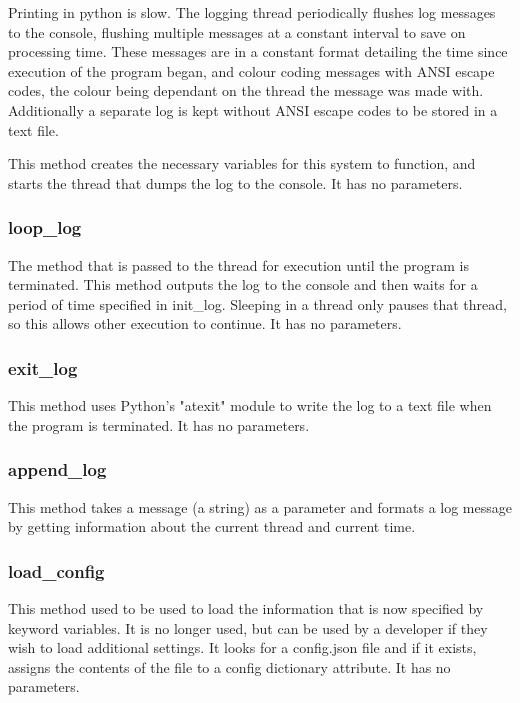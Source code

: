 \documentclass{report}
\begin{document}
Printing in python is slow. The logging thread periodically flushes log messages to the console, flushing multiple messages at a constant interval to save on processing time. These messages are in a constant format detailing the time since execution of the program began, and colour coding messages with ANSI escape codes, the colour being dependant on the thread the message was made with. Additionally a separate log is kept without ANSI escape codes to be stored in a text file.

This method creates the necessary variables for this system to function, and starts the thread that dumps the log to the console. It has no parameters.

\subsubsection{loop\_log}

The method that is passed to the thread for execution until the program is terminated. This method outputs the log to the console and then waits for a period of time specified in init\_log. Sleeping in a thread only pauses that thread, so this allows other execution to continue. It has no parameters.

\subsubsection{exit\_log}

This method uses Python's "atexit" module to write the log to a text file when the program is terminated. It has no parameters.

\subsubsection{append\_log}

This method takes a message (a string) as a parameter and formats a log message by getting information about the current thread and current time.

\subsubsection{load\_config}

This method used to be used to load the information that is now specified by keyword variables. It is no longer used, but can be used by a developer if they wish to load additional settings. It looks for a config.json file and if it exists, assigns the contents of the file to a config dictionary attribute. It has no parameters.
\end{document}
